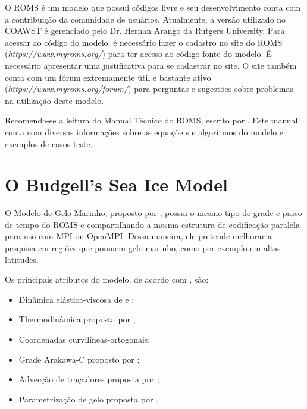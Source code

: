 \noindent O ROMS é um modelo que possui códigos livre e seu desenvolvimento conta com a contribuição da comunidade de usuários. Atualmente, a versão utilizado no COAWST é gerenciado pelo Dr. Hernan Arango da Rutgers University. Para acessar ao código do modelo, é necessário fazer o cadastro no site do ROMS (\textcolor{bleu_cite}{\textit{https://www.myroms.org/}}) para ter acesso ao código fonte do modelo. É necessário apresentar uma justificativa para se cadastrar no site. O site também conta com um fórum extremamente útil e bastante ativo (\textcolor{bleu_cite}{\textit{https://www.myroms.org/forum/}}) para perguntas e sugestões sobre problemas na utilização deste modelo.
\bigskip

\noindent Recomenda-se a leitura do Manual Técnico do ROMS, escrito por \textcite{hedstrom2018}. Este manual conta com diversas informações sobre as equaçõe s e algorítmos do modelo e exemplos de casos-teste. 



\section{O Budgell's Sea Ice Model}
\bigskip

\noindent O Modelo de Gelo Marinho, proposto por \textcite{Budgell2005}, possui o mesmo tipo de grade e passo de tempo do ROMS e compartilhando a mesma estrutura de codificação paralela para uso com MPI ou OpenMPI. Dessa maneira, ele pretende melhorar a pesquisa em regiões que possuem gelo marinho, como por exemplo em altas latitudes. 
\bigskip

\noindent Os principais atributos do modelo, de acordo com \textcite{hedstrom2018}, são:
\bigskip
\begin{itemize}
    \item Dinâmica elástica-viscosa de \textcite{Hunke1997} e \textcite{Hunke2001};
    \item Thermodinâmica proposta por \textcite{Mellor1989};
    \item Coordenadas curvilíneas-ortogonais;
    \item Grade Arakawa-C proposto  por \textcite{Arakawa1977};
    \item Advecção de traçadores proposta por \textcite{Smolarkiewicz1990};
    \item Parametrização de gelo proposta por \textcite{Lemieux2015}.
\end{itemize}
\bigskip


